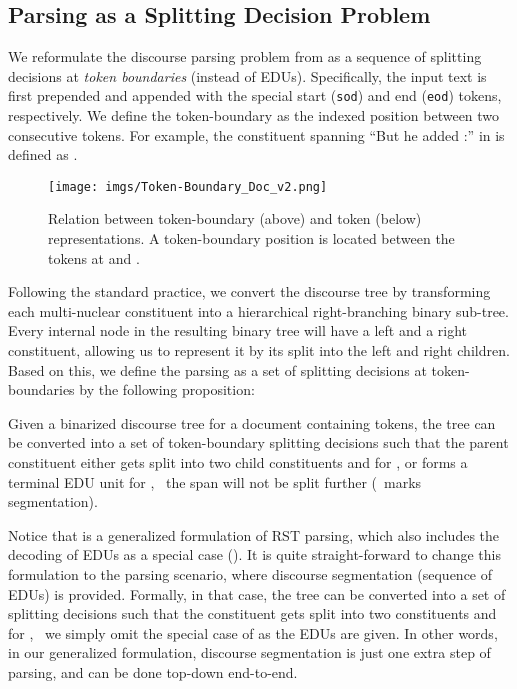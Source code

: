 \subsection{Parsing as a Splitting Decision Problem}



We reformulate the discourse parsing problem from  as a sequence of splitting decisions at \emph{token boundaries} (instead of EDUs). Specifically, the input text is first prepended and appended with the special start (\texttt{{sod}}) and end (\texttt{{eod}}) tokens, respectively. We define the token-boundary as the indexed position between two consecutive tokens. For example, the constituent spanning ``But he added :'' in  is defined as . 


\begin{figure}[t!]
\begin{center}
\texttt{[image: imgs/Token-Boundary\_Doc\_v2.png]}
\end{center}
\caption{Relation between token-boundary (above) and token (below) representations. A token-boundary position  is located between the tokens at  and .} 
\label{fig:Token-Boundary_Convert_Docs}
\end{figure}




Following the standard practice, we convert the discourse tree by transforming each multi-nuclear constituent into a hierarchical right-branching binary sub-tree. Every internal node in the resulting binary tree will have a left and a right constituent, allowing us to represent it by its split into the left and right children. Based on this, we define the parsing as a set of splitting decisions  at token-boundaries by the following proposition:
\begin{prop}
\label{prop:2} 
Given a binarized discourse tree for a document containing  tokens, the tree can be converted into a set of token-boundary splitting decisions  such that the parent constituent  either gets split into two child constituents  and  for , or forms a terminal EDU unit for , \ie\ the span will not be split further (\ie\ marks segmentation).
\end{prop}


Notice that  is a generalized formulation of RST parsing, which also includes the decoding of EDUs as a special case (). It is quite straight-forward to change this formulation to the parsing scenario, where discourse segmentation (sequence of EDUs) is provided. Formally, in that case, the tree can be converted into a set of splitting decisions  such that the constituent  gets split into two constituents  and  for , \ie\ we simply omit the special case of  as the EDUs are given. In other words, in our generalized formulation, discourse segmentation is just one extra step of parsing, and can be done top-down end-to-end. 







